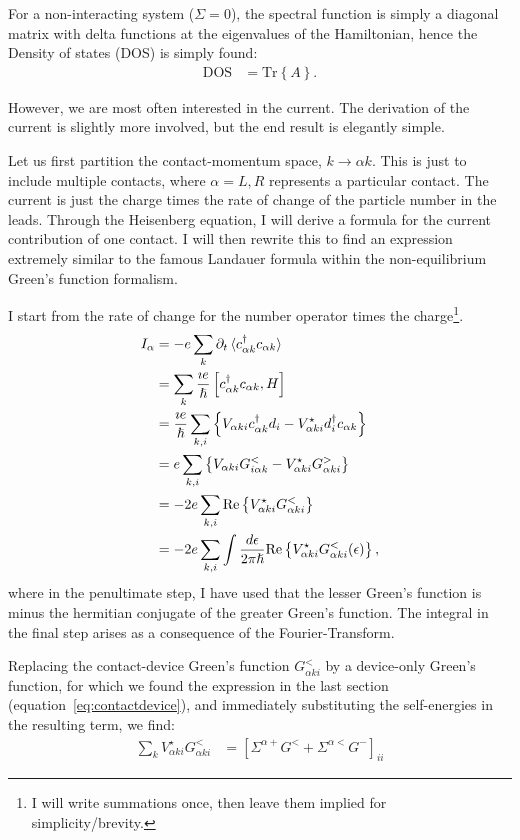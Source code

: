 For a non\hyp{}interacting system ($\Sigma=0$), the spectral function is simply a diagonal matrix with delta functions at the eigenvalues of the Hamiltonian, hence the Density of states (DOS) is simply found:
\begin{align}
\text{DOS} &= \text{Tr}\left\{A\right\}.
\label{eq:dos}
\end{align}


However, we are most often interested in the current. The derivation of the current is slightly more involved, but the end result is elegantly simple.

Let us first partition the contact-momentum space, $k \rightarrow \alpha k$. This is just to include multiple contacts, where $\alpha = L, R$ represents a particular contact.  The current is just the charge times the rate of change of the particle number in the leads. Through the Heisenberg equation, I will derive a formula for the current contribution of one contact. I will then rewrite this to find an expression extremely similar to the famous Landauer formula within the non-equilibrium Green's function formalism.

I start from the rate of change for the number operator times the charge\footnote{I will write summations once, then leave them implied for simplicity/brevity.}.  
\begin{align*}
I_\alpha &= - e \sum_{k} \partial_t \braket{c^\dagger_{\alpha k} c_{\alpha k}} \\
&= \sum_k \frac{\imath e}{\hslash} \left[ c^\dagger_{\alpha k} c_{\alpha k}, H\right] \\
&= \frac{\imath e}{\hslash}\sum_{k, i} \left\{ V_{\alpha ki} c^\dagger_{\alpha k} d_i - V^\star_{\alpha ki} d_i^\dagger c_{\alpha k}\right\} \\
&= e \sum_{k, i}\left\{ V_{\alpha ki} G^<_{i\alpha k} - V_{\alpha ki}^\star G^>_{\alpha ki}\right\}\\
&= -2e \sum_{k, i} \text{Re}\left\{V^\star_{\alpha ki}G^<_{\alpha ki}\right\} \\
&= -2e \sum_{k, i}\int \frac{d\epsilon}{2\pi\hslash} \text{Re}\left\{ V^\star_{\alpha ki} G^<_{\alpha ki} (\epsilon) \right\},
\end{align*}
where in the penultimate step, I have used that the lesser Green's function is minus the hermitian conjugate of the greater Green's function. The integral in the final step arises as a consequence of the Fourier-Transform.

Replacing the contact-device Green's function $G^<_{\alpha ki}$ by a device-only Green's function, for which we found the expression in the last section (equation~\ref{eq:contactdevice}), and immediately substituting the self-energies in the resulting term, we find:
\begin{align*}
\sum_{k} V^\star_{\alpha ki} G^<_{\alpha ki} &= \left[\Sigma^{\alpha+} G^< + \Sigma^{\alpha <} G^-\right]_{ii}
\end{align*}

